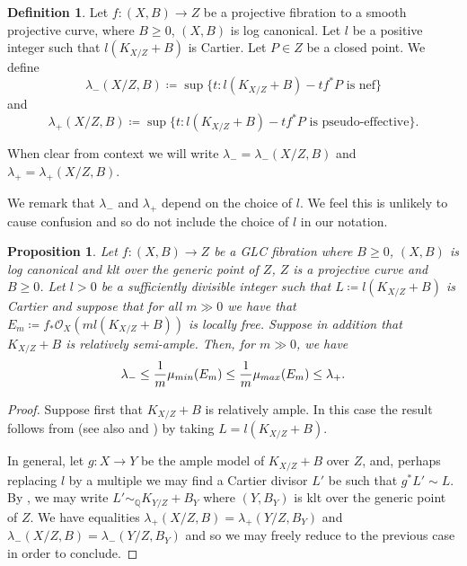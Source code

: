 \documentclass[12pt]{amsart}
\theoremstyle{plain}
\newtheorem{proposition}[theorem]{Proposition}
\theoremstyle{definition}
\newtheorem{definition}[theorem]{Definition}
\begin{document}
\begin{definition}
\label{defn_lambda}
Let $f\colon (X, B) \rightarrow Z$ be a projective fibration to a
smooth projective curve, where $B \geq 0$, $(X, B)$
is log canonical.
Let $l$ be a positive integer such that $l(K_{X/Z}+B)$ is Cartier.
Let $P \in Z$ be a closed point.
We define 
\[\lambda_-(X/Z, B) \coloneqq \sup \{ t : l(K_{X/Z}+B)-tf^*P \text{ is nef}\}\]
and 
\[\lambda_+(X/Z, B) \coloneqq \sup \{ t : l(K_{X/Z}+B)-tf^*P \text{ is pseudo-effective}\}.\]

When clear from context we will write $\lambda_- = \lambda_-(X/Z, B)$ and $\lambda_+ = \lambda_+(X/Z, B)$.
\end{definition}

We remark that $\lambda_-$ and $\lambda_+$ depend on the choice of $l$.  We feel this is unlikely to cause
confusion and so do not include the choice of $l$ in our notation.


\begin{proposition}
\label{prop_threshold_to_slope}
Let $f\colon (X, B) \rightarrow Z$ be a GLC fibration where $B \geq 0$,  
$(X, B)$ is log canonical and klt over the generic point of $Z$, 
$Z$ is a projective curve and $B \geq 0$.
Let $l>0$ be a sufficiently divisible integer such that $L \coloneqq l(K_{X/Z}+B)$ is Cartier
and suppose that for all $m \gg 0$ we have that $E_m \coloneqq f_*\mathcal O_X(ml(K_{X/Z}+B))$ is locally free.
Suppose in addition that $K_{X/Z}+B$ is relatively
semi-ample.
Then, for $m \gg 0$, we have
\[
\lambda_- \leq \frac{1}{m}\mu_{{\rm min}}(E_m) \leq \frac{1}{m}\mu_{{\rm max}}(E_m) \leq \lambda_+.
\]
\end{proposition}
\begin{proof}
Suppose first that $K_{X/Z}+B$ is relatively ample.  In this case the result 
follows from \cite[Lemma-Definition 2.26]{XZ20} (see also 
\cite[Proposition 5.4]{CoPa21} and \cite[Proposition 6.4]{CoPa21}) by taking $L = l(K_{X/Z}+B)$.


In general, let $g\colon X \rightarrow Y$ be the ample model of $K_{X/Z}+B$ over $Z$, and, perhaps replacing $l$ by a multiple 
we may find a Cartier divisor $L'$ be such that $g^*L' \sim L$.
By \cite[Theorem 0.2]{Ambro05}, we may write $L' \sim_{\mathbb Q} K_{Y/Z}+B_Y$ 
where $(Y, B_Y)$ is klt over the generic point of $Z$.
We have equalities $\lambda_+(X/Z, B) = \lambda_+(Y/Z, B_Y)$ and $\lambda_-(X/Z, B) = \lambda_-(Y/Z, B_Y)$
and so we may freely reduce to the previous case
in order to conclude.
\end{proof}
\end{document}
